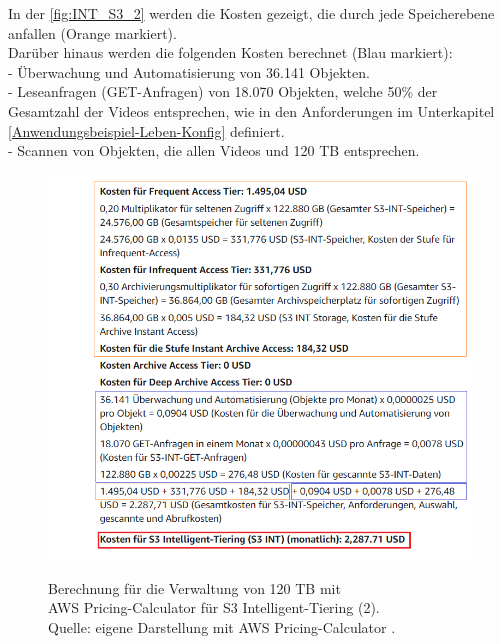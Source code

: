 \newpage
In der \autoref{fig:INT_S3_2} werden die Kosten gezeigt, die durch jede Speicherebene anfallen (Orange markiert). 
\\
Darüber hinaus werden die folgenden Kosten berechnet (Blau markiert): \\
- Überwachung und Automatisierung von 36.141 Objekten.\\
- Leseanfragen (GET-Anfragen) von 18.070 Objekten, welche 50\% der Gesamtzahl der Videos entsprechen, wie in den Anforderungen im Unterkapitel \ref{Anwendungsbeispiel-Leben-Konfig} definiert. \\
- Scannen von Objekten, die allen Videos und 120 TB entsprechen.
\\
\begin{figure}[h!]
  \centering
  \includegraphics[scale=0.6]{sources/S3_INT_2}
  \caption[Berechnung für die Verwaltung von 120 TB mit AWS Pricing-Calculator für S3 Intelligent-Tiering (2)]{}
  \label{fig:INT_S3_2} Berechnung für die Verwaltung von 120 TB mit\\ AWS Pricing-Calculator für S3 Intelligent-Tiering (2).\\
  Quelle: eigene Darstellung mit AWS Pricing-Calculator \cite{AMZ17-S3}.
\end{figure}
\newpage
